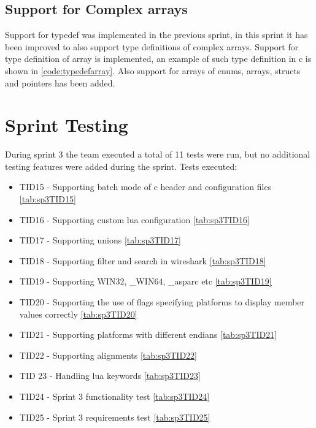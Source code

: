 \subsection{Support for Complex \Glspl{array}}
Support for typedef was implemented in the previous sprint, in this sprint it 
has been improved to also support type definitions of complex \glspl{array}. Support 
for type definition of array is implemented, an example of such type 
definition in \Gls{c} is shown in \autoref{code:typedefarray}. Also support for 
\glspl{array} of \glspl{enum}, \glspl{array}, \glspl{struct} and pointers has been added.



\section{Sprint Testing}
During sprint 3 the team executed a total of 11 tests were run, but no additional testing features were added during the sprint. Tests executed:

\begin{itemize}
	\item TID15 - Supporting \gls{batch mode} of \Gls{c} \gls{header} and configuration files \autoref{tab:sp3TID15}
	\item TID16 - Supporting custom \Gls{lua} configuration \autoref{tab:sp3TID16}
	\item TID17 - Supporting \glspl{union} \autoref{tab:sp3TID17}
	\item TID18 - Supporting filter and search in \Gls{wireshark} \autoref{tab:sp3TID18}
	\item TID19 - Supporting WIN32, \_WIN64, \_\gls{asparc} etc \autoref{tab:sp3TID19}
	\item TID20 -  Supporting the use of flags specifying platforms to display \gls{member} values correctly \autoref{tab:sp3TID20}
	\item TID21 - Supporting platforms with different \glspl{endian} \autoref{tab:sp3TID21}
	\item TID22 - Supporting alignments \autoref{tab:sp3TID22}
	\item TID 23 - Handling \Gls{lua} keywords \autoref{tab:sp3TID23}
	\item TID24 - Sprint 3 functionality test \autoref{tab:sp3TID24}
	\item TID25 - Sprint 3 requirements test \autoref{tab:sp3TID25}
\end{itemize}

